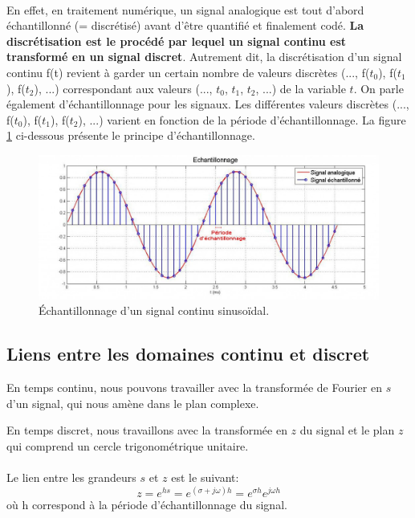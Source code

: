 \paragraph{}
En effet, en traitement numérique, un signal analogique est tout d'abord échantillonné (= discrétisé) avant d'être quantifié et finalement codé. \textbf{La discrétisation est le procédé par lequel un signal continu est transformé en un signal discret}. Autrement dit, la discrétisation d'un signal continu f(t) revient à garder un certain nombre de valeurs discrètes (..., f($t_{0}$), f($t_{1}$), f($t_{2}$), ...) correspondant aux valeurs (..., $t_{0}$, $t_{1}$, $t_{2}$, ...) de la variable $t$. On parle également d'échantillonnage pour les signaux. Les différentes valeurs discrètes (..., f($t_{0}$), f($t_{1}$), f($t_{2}$), ...) varient en fonction de la période d'échantillonnage. La figure \ref{échantillonnage} ci-dessous présente le principe d'échantillonnage.
\begin{figure}[!ht]
\centering
	\includegraphics[scale=0.45]{images/echantillonnage.jpg}
	\caption{Échantillonnage d'un signal continu sinusoïdal.}
	\label{échantillonnage}
\end{figure}

\newpage
\subsection{Liens entre les domaines continu et discret}

En temps continu, nous pouvons travailler avec la transformée de Fourier en $s$ d'un signal, qui nous amène dans le plan complexe.

En temps discret, nous travaillons avec la transformée en $z$ du signal et le plan $z$ qui comprend un cercle trigonométrique unitaire.

\paragraph{}
Le lien entre les grandeurs $s$ et $z$ est le suivant:
\begin{equation}
z = e^{hs} = e^{(\sigma + j\omega)h} = e^{\sigma h}e^{j\omega h}
\end{equation}
où h correspond à la période d'échantillonnage du signal.
